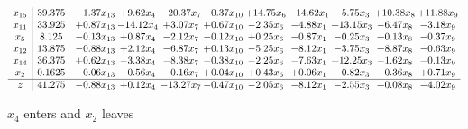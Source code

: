 \documentclass[9pt]{article}
\begin{document}
 \[\begin{array}{c| c c@{\hskip 2pt} c@{\hskip 2pt} c@{\hskip 2pt} c@{\hskip 2pt} c@{\hskip 2pt} c@{\hskip 2pt} c@{\hskip 2pt} c@{\hskip 2pt} c@{\hskip 2pt} }
 x_{15}   &  39.375 & -1.37 x_{13} & +  9.62 x_{4} & -20.37 x_{7} & -0.37 x_{10} & + 14.75 x_{6} & -14.62 x_{1} & -5.75 x_{3} & + 10.38 x_{8} & + 11.88 x_{9}\\
 x_{11}   &  33.925 & +  0.87 x_{13} & -14.12 x_{4} & +  3.07 x_{7} & +  0.67 x_{10} & -2.35 x_{6} & -4.88 x_{1} & + 13.15 x_{3} & -6.47 x_{8} & -3.18 x_{9}\\
 x_{5}   &  8.125 & -0.13 x_{13} & +  0.87 x_{4} & -2.12 x_{7} & -0.12 x_{10} & +  0.25 x_{6} & -0.87 x_{1} & -0.25 x_{3} & +  0.13 x_{8} & -0.37 x_{9}\\
 x_{12}   &  13.875 & -0.88 x_{13} & +  2.12 x_{4} & -6.87 x_{7} & +  0.13 x_{10} & -5.25 x_{6} & -8.12 x_{1} & -3.75 x_{3} & +  8.87 x_{8} & -0.63 x_{9}\\
 x_{14}   &  36.375 & +  0.62 x_{13} & -3.38 x_{4} & -8.38 x_{7} & -0.38 x_{10} & -2.25 x_{6} & -7.63 x_{1} & + 12.25 x_{3} & -1.62 x_{8} & -0.13 x_{9}\\
 x_{2}   &  0.1625 & -0.06 x_{13} & -0.56 x_{4} & -0.16 x_{7} & +  0.04 x_{10} & +  0.43 x_{6} & +  0.06 x_{1} & -0.82 x_{3} & +  0.36 x_{8} & +  0.71 x_{9}\\
\hline
z    &  41.275 & -0.88 x_{13} & +  0.12 x_{4} & -13.27 x_{7} & -0.47 x_{10} & -2.05 x_{6} & -8.12 x_{1} & -2.55 x_{3} & +  0.08 x_{8} & -4.02 x_{9}\\
\end{array}\]


 $ x_{4} $ enters and $ x_{2} $ leaves 
\end{document}
